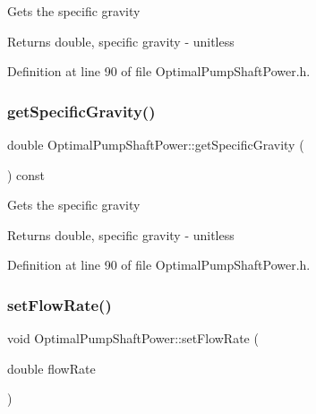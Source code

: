 Gets the specific gravity

\begin{DoxyReturn}{Returns}
double, specific gravity -\/ unitless 
\end{DoxyReturn}


Definition at line 90 of file Optimal\+Pump\+Shaft\+Power.\+h.

\mbox{\label{class_optimal_pump_shaft_power_a607d32c56edece639e03007adc1bf325}} 
\subsubsection{\texorpdfstring{get\+Specific\+Gravity()}{getSpecificGravity()}\hspace{0.1cm}{\footnotesize\ttfamily [3/3]}}
{\footnotesize\ttfamily double Optimal\+Pump\+Shaft\+Power\+::get\+Specific\+Gravity (\begin{DoxyParamCaption}{ }\end{DoxyParamCaption}) const\hspace{0.3cm}{\ttfamily [inline]}}

Gets the specific gravity

\begin{DoxyReturn}{Returns}
double, specific gravity -\/ unitless 
\end{DoxyReturn}


Definition at line 90 of file Optimal\+Pump\+Shaft\+Power.\+h.

\mbox{\label{class_optimal_pump_shaft_power_a38efdee39db4c3856915f1ab26d44ed2}} 
\subsubsection{\texorpdfstring{set\+Flow\+Rate()}{setFlowRate()}\hspace{0.1cm}{\footnotesize\ttfamily [1/3]}}
{\footnotesize\ttfamily void Optimal\+Pump\+Shaft\+Power\+::set\+Flow\+Rate (\begin{DoxyParamCaption}\item[{double}]{flow\+Rate }\end{DoxyParamCaption})\hspace{0.3cm}{\ttfamily [inline]}}

